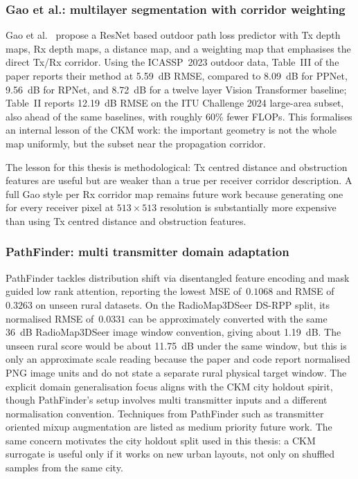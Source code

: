 \subsubsection{Gao et al.: multilayer segmentation with corridor weighting}

Gao et al.\ \cite{gao2026} propose a ResNet based outdoor path loss predictor
with Tx depth maps, Rx depth maps, a distance map, and a weighting map that
emphasises the direct Tx/Rx corridor.  Using the ICASSP~2023 outdoor data,
Table~III of the paper reports their method at \SI{5.59}{dB} RMSE, compared
to \SI{8.09}{dB} for PPNet, \SI{9.56}{dB} for RPNet, and \SI{8.72}{dB} for a
twelve layer Vision Transformer baseline; Table~II reports \SI{12.19}{dB}
RMSE on the ITU Challenge 2024 large-area subset, also ahead of the same
baselines, with roughly 60\% fewer FLOPs. This formalises an internal lesson of
the CKM work: the important geometry is not the whole map uniformly, but the
subset near the propagation corridor.

The lesson for this thesis is methodological: Tx centred distance and
obstruction features are useful but are weaker than a true per receiver
corridor description. A full Gao style per Rx corridor map remains future work
because generating one for every receiver pixel at \(513\times513\) resolution
is substantially more expensive than using Tx centred distance and obstruction
features.

\subsubsection{PathFinder: multi transmitter domain adaptation}

PathFinder \cite{pathfinder2025} tackles distribution shift via disentangled
feature encoding and mask guided low rank attention, reporting the lowest MSE
of~$0.1068$ and RMSE of~$0.3263$ on unseen rural datasets. On the
RadioMap3DSeer DS-RPP split, its normalised RMSE of~$0.0331$ can be
approximately converted with the same \SI{36}{dB} RadioMap3DSeer image window convention,
giving about \SI{1.19}{dB}. The unseen rural score would be about
\SI{11.75}{dB} under the same window, but this is only an approximate scale
reading because the paper and code report normalised PNG image units and do not
state a separate rural physical target window. The explicit
domain generalisation focus aligns with the CKM city holdout spirit, though
PathFinder's setup involves multi transmitter inputs and a different
normalisation convention. Techniques from PathFinder such as
transmitter oriented mixup augmentation are listed as medium priority future
work. The same concern motivates the city holdout split used in this thesis: a
CKM surrogate is useful only if it works on new urban layouts, not only on
shuffled samples from the same city.


